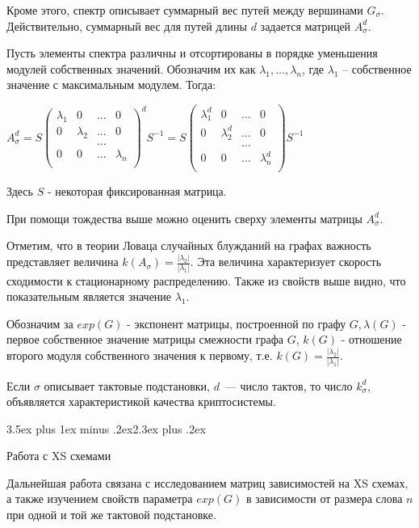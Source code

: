 \documentclass[a4paper,12pt]{report}
\makeatletter
\theoremstyle{plain} %
\theoremstyle{definition}
\theoremstyle{remark}
\renewcommand{\section}{\@startsection{section}{1}{18pt}%
{3.5ex plus 1ex minus .2ex}{2.3ex plus .2ex}%
{\normalfont\Large\bfseries\raggedright}}%
\makeatother
\begin{document}
\begin{large}
Кроме этого, спектр описывает суммарный вес путей между вершинами $G_{\sigma}$. Действительно, суммарный вес для путей длины $d$ задается матрицей $A_{\sigma}^d$.

Пусть элементы спектра различны и отсортированы в порядке уменьшения модулей собственных значений. Обозначим их как $\lambda_1,\ldots, \lambda_n$, где $\lambda_1$ -- собственное значение с максимальным модулем. Тогда:

$A_{\sigma}^d = S \begin{pmatrix} 
\lambda_1 & 0 & \ldots & 0\\ 
0 & \lambda_2 & \ldots & 0\\
  &     & \ldots &\\
0 &  0  & \ldots & \lambda_n\\
\end{pmatrix}^d S^{-1} =  S \begin{pmatrix} 
\lambda^d_1 & 0 & \ldots & 0\\ 
0 & \lambda^d_2 & \ldots & 0\\
  &     & \ldots &\\
0 &  0  & \ldots & \lambda^d_n\\
\end{pmatrix} S^{-1}$

Здесь $S$ - некоторая фиксированная матрица. 

При помощи тождества выше можно оценить сверху элементы матрицы $A_{\sigma}^d$.

Отметим, что в теории Ловаца  случайных блужданий на графах \cite{lovasz_walks} важность представляет величина $k(A_{\sigma}) = \frac{|\lambda_2|}{|\lambda_1|}$. Эта величина характеризует скорость сходимости к стационарному распределению. Также из свойств выше видно, что показательным является значение $\lambda_1$. 

Обозначим за $exp(G)$ - экспонент матрицы, построенной по графу $G, \lambda(G)$ - первое  собственное значение матрицы смежности графа $G$, $k(G)$ - отношение второго модуля собственного значения к первому, т.е. $k(G) = \frac{|\lambda_2|}{|\lambda_1|}$.

Если $\sigma$ описывает тактовые подстановки, $d$~--- число тактов,
то число $k_\sigma^d$, объявляется характеристикой качества криптосистемы.

\section{Работа с XS схемами}

Дальнейшая работа связана с исследованием матриц зависимостей на XS схемах, а также изучением свойств параметра $exp(G)$ в зависимости от размера слова $n$ при одной и той же тактовой подстановке.


\end{large}
\end{document}
